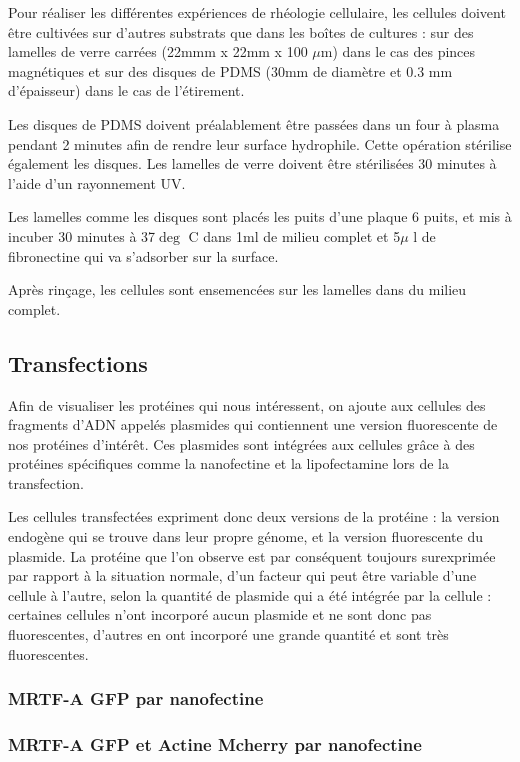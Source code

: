 \documentclass{report}
\begin{document}
	Pour réaliser les différentes expériences de rhéologie cellulaire, les cellules doivent être cultivées sur d'autres substrats que dans les boîtes de cultures : sur des lamelles de verre carrées (22mmm x 22mm x 100 $\mu$m) dans le cas des pinces magnétiques et sur des disques de PDMS (30mm de diamètre et 0.3 mm d'épaisseur) dans le cas de l'étirement. 
	
	Les disques de PDMS doivent préalablement être passées dans un four à plasma pendant 2 minutes afin de rendre leur surface hydrophile. Cette opération stérilise également les disques. Les lamelles de verre doivent être stérilisées 30 minutes à l'aide d'un rayonnement UV. 
	
	Les lamelles comme les disques sont placés les puits d'une plaque 6 puits, et mis à incuber 30 minutes à 37$\deg$ C dans 1ml de milieu complet et 5$ \mu$ l de fibronectine qui va s'adsorber sur la surface. 
	
	Après rinçage, les cellules sont ensemencées sur les lamelles dans du milieu complet. 
	
	\subsection{Transfections}
	Afin de visualiser les protéines qui nous intéressent, on ajoute aux cellules des fragments d'ADN appelés plasmides qui contiennent une version fluorescente de nos protéines d'intérêt. Ces plasmides sont intégrées aux cellules grâce à des protéines spécifiques comme la nanofectine et la lipofectamine lors de la transfection. 
	
	Les cellules transfectées expriment donc deux versions de la protéine : la version endogène qui se trouve dans leur propre génome, et la version fluorescente du plasmide. La protéine que l'on observe est par conséquent toujours surexprimée par rapport à la situation normale, d'un facteur qui peut être variable d'une cellule à l'autre, selon la quantité de plasmide qui a été intégrée par la cellule : certaines cellules n'ont incorporé aucun plasmide et ne sont donc pas fluorescentes, d'autres en ont incorporé une grande quantité et sont très fluorescentes. 
	
		\subsubsection{MRTF-A GFP par nanofectine}
		
		\subsubsection{MRTF-A GFP et Actine Mcherry par nanofectine}
\end{document}
